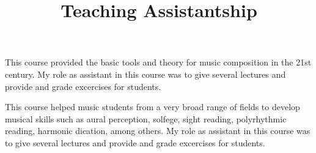 \title{ Teaching Assistantship}
\begin{position}
This course provided the basic tools and theory for music composition in the 21st century. My role as assistant in this course was to give several lectures and provide and grade excercises for students.
\end{position}

\begin{position}
This course helped music students from a very broad range of fields to develop musical skills such as aural perception, solfege, sight reading, polyrhythmic reading, harmonic dication, among others. My role as assistant in this course was to give several lectures and provide and grade excercises for students.
\end{position}
